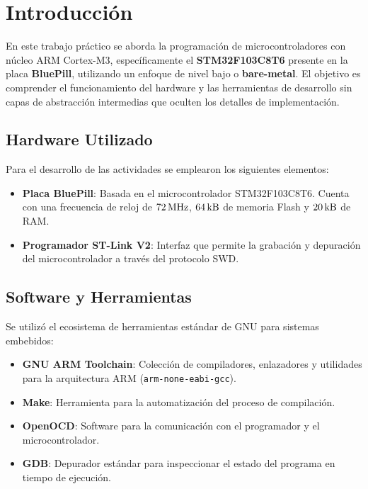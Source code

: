 \chapter{Introducción}

En este trabajo práctico se aborda la programación de microcontroladores con núcleo ARM 
Cortex-M3, específicamente el \textbf{STM32F103C8T6} presente en la placa \textbf{BluePill}, 
utilizando un enfoque de nivel bajo o \textbf{bare-metal}. El objetivo es comprender el 
funcionamiento del hardware y las herramientas de desarrollo sin capas de abstracción 
intermedias que oculten los detalles de implementación.

\section{Hardware Utilizado}

Para el desarrollo de las actividades se emplearon los siguientes elementos:

\begin{itemize}
    \item \textbf{Placa BluePill}: Basada en el microcontrolador STM32F103C8T6. Cuenta con 
    una frecuencia de reloj de $72 \,\mathrm{MHz}$, $64 \,\mathrm{kB}$ de memoria Flash y $20 \,\mathrm{kB}$ de RAM.
    \item \textbf{Programador ST-Link V2}: Interfaz que permite la grabación y depuración 
    del microcontrolador a través del protocolo SWD.
\end{itemize}

\section{Software y Herramientas}

Se utilizó el ecosistema de herramientas estándar de GNU para sistemas embebidos:

\begin{itemize}
    \item \textbf{GNU ARM Toolchain}: Colección de compiladores, enlazadores y utilidades 
    para la arquitectura ARM (\texttt{arm-none-eabi-gcc}).
    \item \textbf{Make}: Herramienta para la automatización del proceso de compilación.
    \item \textbf{OpenOCD}: Software para la comunicación con el programador y el 
    microcontrolador.
    \item \textbf{GDB}: Depurador estándar para inspeccionar el estado del programa en 
    tiempo de ejecución.
\end{itemize}

